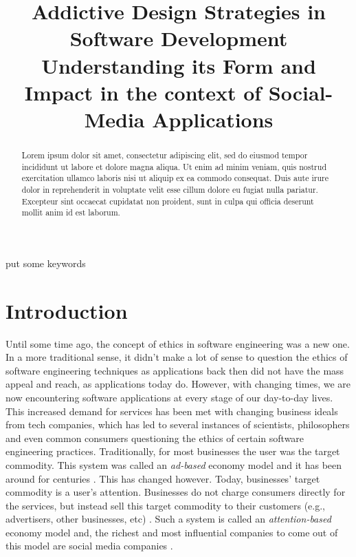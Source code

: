 \documentclass[conference]{IEEEtran}
\begin{document}
\title{Addictive Design Strategies in Software Development\\
\large Understanding its Form and Impact in the context of Social-Media Applications}

\author{

}

\maketitle

\begin{abstract}
Lorem ipsum dolor sit amet, consectetur adipiscing elit, sed do eiusmod tempor incididunt ut labore et dolore magna aliqua. Ut enim ad minim veniam, quis nostrud exercitation ullamco laboris nisi ut aliquip ex ea commodo consequat. Duis aute irure dolor in reprehenderit in voluptate velit esse cillum dolore eu fugiat nulla pariatur. Excepteur sint occaecat cupidatat non proident, sunt in culpa qui officia deserunt mollit anim id est laborum.
\end{abstract}

\begin{IEEEkeywords}
put some keywords
\end{IEEEkeywords}

\section{Introduction}
Until some time ago, the concept of ethics in software engineering was a new one. In a more traditional sense, it didn't make a lot of sense to question the ethics of software engineering techniques as applications back then did not have the mass appeal and reach, as applications today do. However, with changing times, we are now encountering software applications at every stage of our day-to-day lives. This increased demand for services has been met with changing business ideals from tech companies, which has led to several instances of scientists, philosophers and even common consumers questioning the ethics of  certain software engineering practices. Traditionally, for most businesses the user was the target commodity. This system was called an {\it ad-based} economy model and it has been around for centuries \cite{wu2016}. This has changed however. Today, businesses' target commodity is a user's attention. Businesses do not charge consumers directly for the services, but instead sell this target commodity to their customers (e.g., advertisers, other businesses, etc) \cite{williams2018}. Such a system is called an {\it attention-based} economy model and, the richest and most influential companies to come out of this model are social media companies \cite{pwc2018}.
\end{document}
